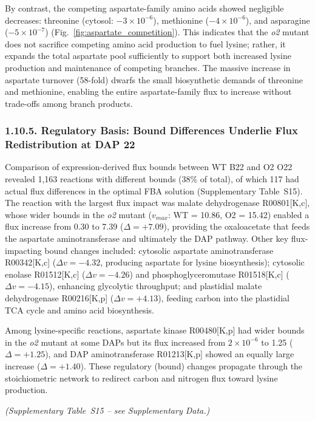 \documentclass[12pt,a4paper]{article}
\begin{document}
By contrast, the competing aspartate-family amino acids showed negligible decreases: threonine (cytosol: $-3 \times 10^{-6}$), methionine ($-4 \times 10^{-6}$), and asparagine ($-5 \times 10^{-7}$) (Fig.~\ref{fig:aspartate_competition}). This indicates that the \textit{o2} mutant does not sacrifice competing amino acid production to fuel lysine; rather, it expands the total aspartate pool sufficiently to support both increased lysine production and maintenance of competing branches. The massive increase in aspartate turnover (58-fold) dwarfs the small biosynthetic demands of threonine and methionine, enabling the entire aspartate-family flux to increase without trade-offs among branch products.

\subsubsection{1.10.5. Regulatory Basis: Bound Differences Underlie Flux Redistribution at DAP 22}

Comparison of expression-derived flux bounds between WT B22 and O2 O22 revealed 1,163 reactions with different bounds (38\% of total), of which 117 had actual flux differences in the optimal FBA solution (Supplementary Table~S15). The reaction with the largest flux impact was malate dehydrogenase R00801[K,c], whose wider bounds in the \textit{o2} mutant ($v_{max}$: WT = 10.86, O2 = 15.42) enabled a flux increase from 0.30 to 7.39 ($\Delta = +7.09$), providing the oxaloacetate that feeds the aspartate aminotransferase and ultimately the DAP pathway. Other key flux-impacting bound changes included: cytosolic aspartate aminotransferase R00342[K,c] ($\Delta v = -4.32$, producing aspartate for lysine biosynthesis); cytosolic enolase R01512[K,c] ($\Delta v = -4.26$) and phosphoglyceromutase R01518[K,c] ($\Delta v = -4.15$), enhancing glycolytic throughput; and plastidial malate dehydrogenase R00216[K,p] ($\Delta v = +4.13$), feeding carbon into the plastidial TCA cycle and amino acid biosynthesis.

Among lysine-specific reactions, aspartate kinase R00480[K,p] had wider bounds in the \textit{o2} mutant at some DAPs but its flux increased from $2 \times 10^{-6}$ to 1.25 ($\Delta = +1.25$), and DAP aminotransferase R01213[K,p] showed an equally large increase ($\Delta = +1.40$). These regulatory (bound) changes propagate through the stoichiometric network to redirect carbon and nitrogen flux toward lysine production.


\noindent\textit{(Supplementary Table~S15 -- see Supplementary Data.)}
\end{document}
